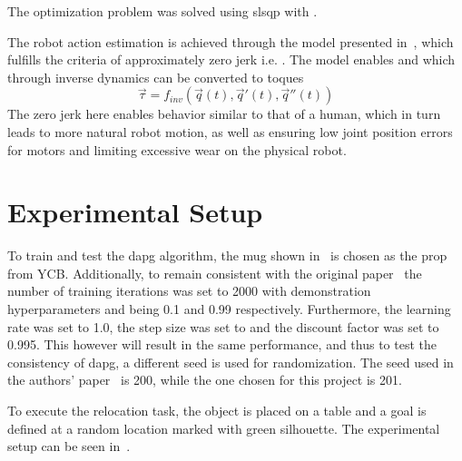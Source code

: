 The optimization problem was solved using \gls{slsqp} with .\medskip

The robot action estimation is achieved through the model  presented in~\cite{smoothness-maximization-along-a-predefined-path-accurately-predicts-the-speed-profiles-of-complex-arm-movements}, which fulfills the criteria of approximately zero jerk i.e. . The model enables  and  which through inverse dynamics can be converted to toques \mvar{\vec{\tau}}
%
\begin{equation}
    \vec{\tau} = f_{inv}\left(\vec{q}(t),\vec{q}'(t),\vec{q}''(t)\right)
\end{equation}
The zero jerk here enables behavior similar to that of a human, which in turn leads to more natural robot motion, as well as ensuring low joint position errors for motors and limiting excessive wear on the physical robot.

\section{Experimental Setup}\label{sec:3-in-hand-manipulation-experimental-setup}

To train and test the \gls{dapg} algorithm, the mug shown in~ is chosen as the prop from YCB. Additionally, to remain consistent with the original paper~\cite{dexmv:-imitation-learning-for-dexterous-manipulation-from-human-videos} the number of training iterations was set to \num{2000} with demonstration hyperparameters  and  being \num{0.1} and \num{0.99} respectively. Furthermore, the learning rate  was set to \num{1.0}, the step size \mvar{\delta} was set to  and the discount factor \mvar{\gamma} was set to \num{0.995}. This however will result in the same performance, and thus to test the consistency of \gls{dapg}, a different seed is used for randomization. The seed used in the authors' paper~\cite{dexmv:-imitation-learning-for-dexterous-manipulation-from-human-videos} is \num{200}, while the one chosen for this project is \num{201}. \medskip

To execute the relocation task, the object is placed on a table and a goal is defined at a random location marked with green silhouette. The experimental setup can be seen in~.


